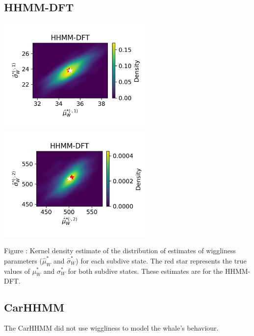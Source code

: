\documentclass{article}
\begin{document}
        \subsection{HHMM-DFT}
        \begin{center}
        \includegraphics[width=3in]{../Plots/hhmm_FV_uncorr_MLE_density_FoVeDBA_0_0.png}
        \includegraphics[width=3in]{../Plots/hhmm_FV_uncorr_MLE_density_FoVeDBA_0_1.png}
        \end{center}
        
        \noindent Figure : Kernel density estimate of the distribution of estimates of wiggliness parameters ($\hat \mu^*_W$ and $\hat \sigma^*_W$) for each subdive state. The red star represents the true values of $\mu^*_W$ and $\sigma^*_W$ for both subdive states. These estimates are for the HHMM-DFT.
        \addtocounter{fignum}{1}
        
        \subsection{CarHHMM}
        The CarHHMM did not use wiggliness to model the whale's behaviour.
        
\end{document}
